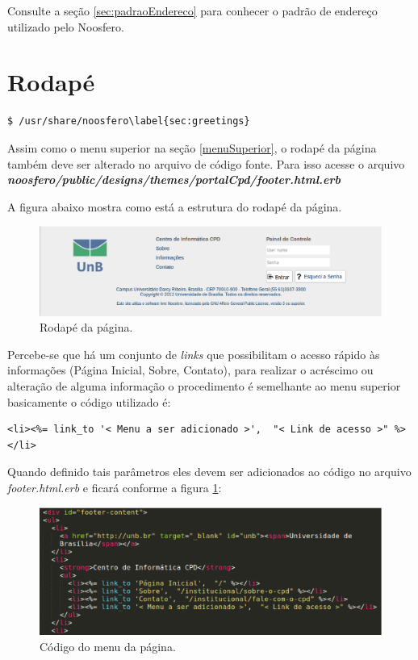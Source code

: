 Consulte a seção \ref{sec:padraoEndereco} para conhecer o padrão de endereço utilizado pelo Noosfero.

\newpage
\section{Rodapé}

\begin{lstlisting}
$ /usr/share/noosfero\label{sec:greetings}
\end{lstlisting}

Assim como o menu superior na seção \ref{menuSuperior}, o rodapé da página também deve ser alterado no arquivo de código fonte. Para isso acesse o arquivo \textbf{\textit{noosfero/public/designs/themes/portalCpd/footer.html.erb}}

A figura abaixo mostra como está a estrutura do rodapé da página.
\begin{figure}[h]
     \centering
       \includegraphics[keepaspectratio=true,scale=0.49]{figuras/footer.eps}
     \caption{Rodapé da página.}
\end{figure}

Percebe-se que há um conjunto de \emph{links} que possibilitam o acesso rápido às informações (Página Inicial, Sobre, Contato), para realizar o acréscimo ou alteração de alguma informação o procedimento é semelhante ao menu superior basicamente o código utilizado é:

\begin{lstlisting}
<li><%= link_to '< Menu a ser adicionado >',  "< Link de acesso >" %></li>
\end{lstlisting}

Quando definido tais parâmetros eles devem ser adicionados ao código no arquivo \emph{footer.html.erb} e ficará conforme a figura \ref{fig:codMenu}:

\begin{figure}[h]
     \centering
       \includegraphics[keepaspectratio=true,scale=0.3]{figuras/footerMenu.eps}
     \caption{Código do menu da página.}
     \label{fig:codMenu}
\end{figure}

